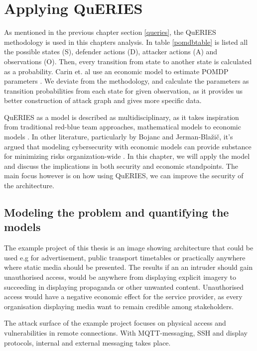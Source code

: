 \chapter{Applying QuERIES} \label{analysis}

As mentioned in the previous chapter section \ref{queries}, the
QuERIES methodology is used in this chapters analysis. In table
\ref{pomdbtable} is listed all the possible states (S), defender
actions (D), attacker actions (A) and observations (O). Then, every
transition from state to another state is calculated as a
probability. Carin et. al use an economic model to estimate POMDP
parameters \cite{carin2008cybersecurity}. We deviate from the
methodology, and calculate the parameters as transition probabilities
from each state for given observation, as it provides us better
construction of attack graph and gives more specific data.

QuERIES as a model is described as multidisciplinary, as it takes
inspiration from traditional red-blue team approaches, mathematical
models to economic models \cite{hughes2013quantitative}. In other
literature, particularly by Bojanc and Jerman-Blažič, it's argued that
modeling cybersecurity with economic models can provide substance for
minimizing risks organization-wide \cite{jerman2008economic}. In this
chapter, we will apply the model and discuss the implications in both
security and economic standpoints. The main focus however is on how
using QuERIES, we can improve the security of the architecture.

\section{Modeling the problem and quantifying the models} \label{modprob}

The example project of this thesis is an image showing architecture that
could be used e.g for advertisement, public transport timetables or
practically anywhere where static media should be presented. The
results if an an intruder should gain unauthorised access, would be
anywhere from displaying explicit imagery to succeeding in displaying
propaganda or other unwanted content. Unauthorised access would have a
negative economic effect for the service provider, as every
organisation displaying media want to remain credible among
stakeholders.

The attack surface of the example project focuses on physical access
and vulnerabilities in remote connections. With MQTT-messaging, SSH
and display protocols, internal and external messaging takes place.

